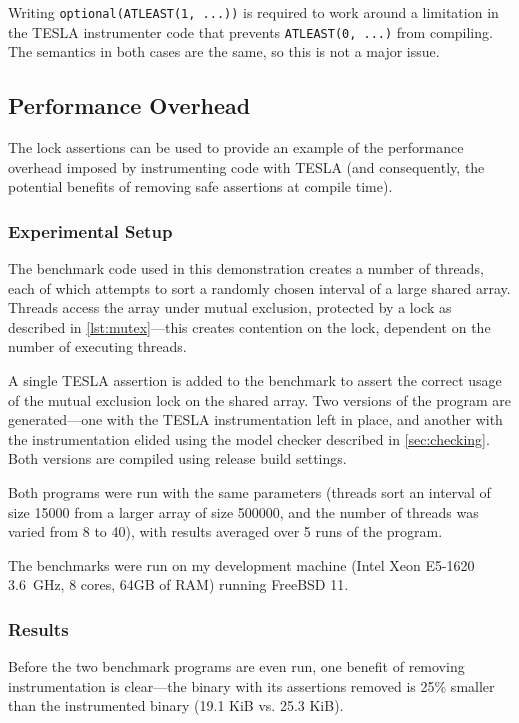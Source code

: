Writing \texttt{optional(ATLEAST(1, ...))} is required to work around a
limitation in the TESLA instrumenter code that prevents
\texttt{ATLEAST(0, ...)} from compiling. The semantics in both cases are
the same, so this is not a major issue.

\subsection{Performance Overhead}

The lock assertions can be used to provide an example of the performance
overhead imposed by instrumenting code with TESLA (and consequently, the
potential benefits of removing safe assertions at compile time).

\subsubsection{Experimental Setup}

The benchmark code used in this demonstration creates a number of
threads, each of which attempts to sort a randomly chosen interval of a
large shared array. Threads access the array under mutual exclusion,
protected by a lock as described in \autoref{lst:mutex}---this creates
contention on the lock, dependent on the number of executing threads.

A single TESLA assertion is added to the benchmark to assert the correct
usage of the mutual exclusion lock on the shared array. Two versions of
the program are generated---one with the TESLA instrumentation left in
place, and another with the instrumentation elided using the model
checker described in \autoref{sec:checking}. Both versions are compiled
using release build settings.

Both programs were run with the same parameters (threads sort an
interval of size \num{15000} from a larger array of size \num{500000},
and the number of threads was varied from 8 to 40), with results
averaged over 5 runs of the program.

The benchmarks were run on my development machine (Intel Xeon E5-1620
\SI{3.6}{\GHz}, 8 cores, 64GB of RAM) running FreeBSD 11.

\subsubsection{Results}

Before the two benchmark programs are even run, one benefit of removing
instrumentation is clear---the binary with its assertions removed is 25\%
smaller than the instrumented binary (\num{19.1} KiB vs. \num{25.3}
KiB).

